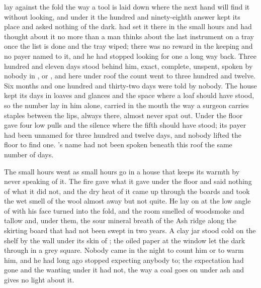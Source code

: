 
 lay against the fold the way a tool is laid down where the next hand will find it without looking, and under it the hundred and ninety-eighth answer kept its place and asked nothing of the dark.  had set it there in the small hours and had thought about it no more than a man thinks about the last instrument on a tray once the list is done and the tray wiped; there was no reward in the keeping and no payer named to it, and he had stopped looking for one a long way back. Three hundred and eleven days stood behind him, exact, complete, unspent, spoken by nobody in ,  or , and here under  roof the count went to three hundred and twelve. Six months and one hundred and thirty-two days were told by nobody. The house kept its days in loaves and glances and the space where a loaf should have stood, so the number lay in him alone, carried in the mouth the way a surgeon carries staples between the lips, always there, almost never spat out. Under the floor  gave four low pulls and the silence where the fifth should have stood; its payer had been unnamed for three hundred and twelve days, and nobody lifted the floor to find one. 's name had not been spoken beneath this roof the same number of days.

The small hours went as small hours go in a house that keeps its warmth by never speaking of it. The fire gave what it gave under the floor and said nothing of what it did not, and the dry heat of it came up through the boards and took the wet smell of the wool almost away but not quite. He lay on  at the low angle of  with his face turned into the fold, and the room smelled of woodsmoke and tallow and, under them, the sour mineral breath of the Ash ridge along the skirting board that had not been swept in two years. A clay jar stood cold on the shelf by the wall under its skin of ; the oiled paper at the window let the dark through in a grey square. Nobody came in the night to count him or to warm him, and he had long ago stopped expecting anybody to; the expectation had gone and the wanting under it had not, the way a coal goes on under ash and gives no light about it.

